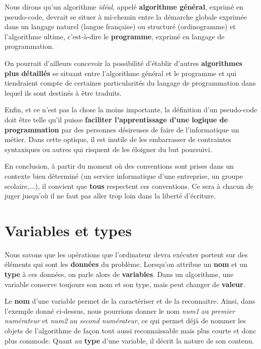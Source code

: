 {
Nous dirons qu’un algorithme \textit{idéal}, appelé \textbf{algorithme
général}, exprimé en pseudo-code, devrait se situer à mi-chemin entre
la démarche globale exprimée dans un langage naturel (langue française)
ou structuré (ordinogramme) et l’algorithme ultime, c’est-à-dire le
\textbf{programme}, exprimé en langage de programmation.}

{
On pourrait d’ailleurs concevoir la possibilité d’établir d’autres
\textbf{algorithmes plus }\textbf{détaillés} se situant entre
l’algorithme général et le programme et qui tiendraient compte de
certaines particularités du langage de programmation dans lequel ils
sont destinés à être traduits.}

{
Enfin, et ce n’est pas la chose la moins importante, la définition d’un
pseudo-code doit être telle qu’il puisse \textbf{faciliter
l’apprentissage d’une logique de programmation} par des personnes
désireuses de faire de l’informatique un métier. Dans cette optique, il
est inutile de les embarrasser de contraintes syntaxiques ou autres qui
risquent de les éloigner du but poursuivi.}

{
En conclusion, à partir du moment où des conventions sont prises dans un
contexte bien déterminé (un service informatique d’une entreprise, un
groupe scolaire,...), il convient que \textbf{tous }respectent ces
conventions. Ce sera à chacun de juger jusqu’où il ne faut pas aller
trop loin dans la liberté d’écriture.}

\section[Variables et types]{\bfseries Variables et types}
{
Nous savons que les opérations que l’ordinateur devra exécuter portent
sur des éléments qui sont les \textbf{données} du problème. Lorsqu’on
attribue un \textbf{nom} et un \textbf{type} à ces données, on parle
alors de \textbf{variables}. Dans un algorithme, une variable conserve
toujours son nom et son type, mais peut changer de \textbf{valeur}.}

{
Le \textbf{nom }d’une variable permet de la caractériser et de la
reconnaitre. Ainsi, dans l’exemple donné ci-dessus, nous pourrions
donner le nom \textit{num1} au \textit{premier numérateur} et
\textit{num2} au \textit{second numérateur}, ce qui permet déjà de
nommer les objets de l’algorithme de façon tout aussi reconnaissable
mais plus courte et donc plus commode. Quant au \textbf{type} d’une
variable, il décrit la nature de son contenu. }

